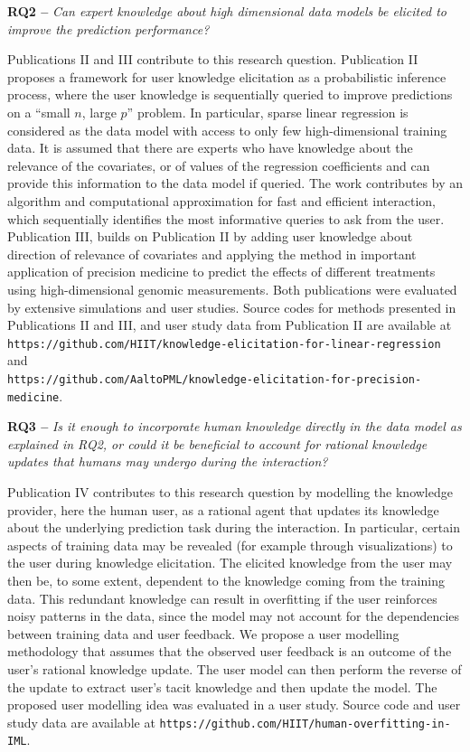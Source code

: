 \documentclass[dissertation,math,vertlayout,pdfa,colorlinks]{aaltoseries}
\begin{document}
\noindent \textbf{RQ2 --} \textit{Can expert knowledge about high dimensional data models be elicited to improve the prediction performance?}

Publications II and III contribute to this research question. Publication II proposes a framework for user knowledge elicitation as a probabilistic inference process, where the user knowledge is sequentially queried to improve predictions on a ``small $n$, large $p$'' problem. In particular, sparse linear regression is considered as the data model with access to only few high-dimensional training data. It is assumed that there are experts who have knowledge about the relevance of the covariates, or of values of the regression coefficients and can provide this information to the data model if queried. The work contributes by an algorithm and computational approximation for fast and efficient interaction, which sequentially identifies the most informative queries to ask from the user. Publication III, builds on Publication II by adding user knowledge about direction of relevance of covariates and applying the method in important application of precision medicine to predict the effects of different treatments using high-dimensional genomic measurements. Both publications were evaluated by extensive simulations and user studies. 
Source codes for methods presented in Publications II and III, and user study data from Publication II are available at \\ \texttt{https://github.com/HIIT/knowledge-elicitation-for-linear-regression} and \\ \texttt{https://github.com/AaltoPML/knowledge-elicitation-for-precision-medicine}.




\noindent \textbf{RQ3 --} \textit{Is it enough to incorporate human knowledge directly in the data model as explained in RQ2, or could it be beneficial to account for rational knowledge updates that humans may undergo during the interaction?}

Publication IV contributes to this research question by modelling the knowledge provider, here the human user, as a rational agent that updates its knowledge about the underlying prediction task during the interaction. In particular, certain aspects of training data may be revealed (for example through visualizations) to the user during knowledge elicitation. The elicited knowledge from the user may then be, to some extent, dependent to the knowledge coming from the training data. This redundant knowledge can  result in overfitting if the user reinforces noisy patterns in the data, since the model may not account for the dependencies between training data and user feedback. We propose a user modelling methodology that assumes that the observed user feedback is an outcome of the user's rational knowledge update. The user model can then perform the reverse of the update to extract user's tacit knowledge and then update the model. The proposed user modelling idea was evaluated in a user study. 
Source code and user study data are available at \texttt{https://github.com/HIIT/human-overfitting-in-IML}.
\end{document}
